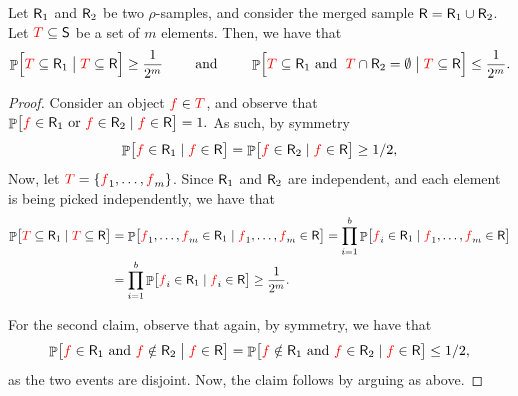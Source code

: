 \begin{lemma}
    Let $\mathsf{R}_1$ and $\mathsf{R}_2$ be two $\rho$-samples, and
    consider the merged sample $\mathsf{R} = \mathsf{R}_1 \cup
    \mathsf{R}_2$. Let ${\textcolor{red}{T}} \subseteq \mathsf{S}$ be a set of $m$
    elements. Then, we have that
    \begin{align*}
      \Prob{ \Bigl. \SetB \subseteq \Sample_1 \bigm\vert{ \SetB \subseteq
      \Sample}} \geq \frac{1}{2^m}
      \qquad \text{ and } \qquad%
      \Prob{ \Bigl. \SetB \subseteq \Sample_1%
      \text{ and }\;
      \SetB \cap \Sample_2 = \emptyset \bigm\vert{ \SetB \subseteq \Sample}}
      \leq \frac{1}{2^m}.
    \end{align*}
\end{lemma}
\begin{proof}
    Consider an object ${\textcolor{red}{f}} \in {\textcolor{red}{T}}$, and observe that
    \begin{math}
        \Prob{\bigl. \obj \in \Sample_1
           \text{ or }  \obj \in \Sample_2
           \mid \obj \in \Sample} = 1.%
    \end{math}
    As such, 
    by symmetry
    \begin{align*}
      \Prob{\bigl. \obj \in \Sample_1 \mid \obj \in \Sample}%
      =%
      \Prob{\bigl. \obj \in \Sample_2 \mid \obj \in \Sample}%
      \geq%
      1/2,
    \end{align*}    
    Now, let ${\textcolor{red}{T}} = \left\{ { {\textcolor{red}{f}}_1, \ldots, {\textcolor{red}{f}}_m} \right\}$. Since
    $\mathsf{R}_1$ and $\mathsf{R}_2$ are independent, and each element is
    being picked independently, we have that
    \begin{align*}
        \Prob{ \bigl. \SetB \subseteq \Sample_1 \mid{ \SetB \subseteq
        \Sample}}%
      &=%
        \Prob{ \bigl. \obj_1, \ldots, \obj_m  \in \Sample_1 \mid{
        \obj_1, \ldots, \obj_m \in \Sample}}
        =%
        \prod_{i=1}^b \Prob{ \bigl. \obj_i  \in \Sample_1 \mid{
        \obj_1, \ldots, \obj_m \in \Sample}}
      \\&%
          =%
          \prod_{i=1}^b \Prob{ \bigl. \obj_i  \in \Sample_1 \mid{
          \obj_i \in \Sample}}
          \geq%
          \frac{1}{2^m}.
    \end{align*}

    For the second claim, observe that again, by
    symmetry, we have that 
    \begin{equation*}
        \ProbCond{\bigl. \obj \in \Sample_1
           \text{ and }
           \obj \notin \Sample_2
        }{ \obj \in \Sample}%
        =%
      \Prob{\bigl. \obj \notin \Sample_1
      \text{ and } \obj \in \Sample_2
      \mid \obj \in \Sample}%
      \leq%
      1/2,
  \end{equation*}
    as the two events are disjoint. Now, the claim follows by arguing
    as above.
\end{proof}

